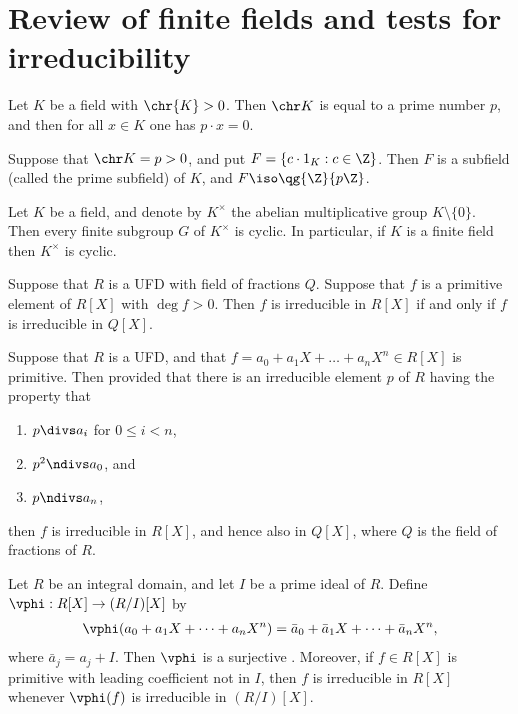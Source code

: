 \documentclass{article}
\begin{document}
\section{Review of finite fields and tests for irreducibility}
  \begin{tproposition}
    Let \( K \) be a field with \( \chr{K} > 0 \). Then \( \chr K \) is equal to a prime number \( p \), and then for all \( x\in K \) one has \( p\cdot x=0 \).
  \end{tproposition}

  \begin{ttheorem}
    Suppose that \( \chr K = p > 0 \), and put \( F=\{ c\cdot 1_K : c\in \Z \} \). Then \( F \) is a subfield (called the prime subfield) of \( K \), and \( F\iso \qg{\Z}{p\Z} \).
  \end{ttheorem}

  \begin{ttheorem}
    Let \( K \) be a field, and denote by \( K^\times \) the abelian multiplicative group \( K\setminus\{ 0 \} \). Then every finite subgroup \( G \) of \( K^\times \) is cyclic. In particular, if \( K \) is a finite field then \( K^\times \) is cyclic.
  \end{ttheorem}

  \begin{ttheorem}
    Suppose that \( R \) is a UFD with field of fractions \( Q \). Suppose that \( f \) is a primitive element of \( R[X] \) with \( \deg f > 0 \). Then \( f \) is irreducible in \( R[X] \) if and only if \( f \) is irreducible in \( Q[X] \).
  \end{ttheorem}

  \begin{ttheorem}
    Suppose that \( R \) is a UFD, and that \( f=a_0+a_1X+\ldots+a_nX^n \in R[X] \) is primitive. Then provided that there is an irreducible element \( p \) of \( R \) having the property that
    \begin{enumerate}[label=(\roman*)]
      \item \( p\divs a_i \) for \( 0\leq i<n \),
      \item \( p^2 \ndivs a_0 \), and
      \item \( p \ndivs a_n \),
    \end{enumerate}
    then \( f \) is irreducible in \( R[X] \), and hence also in \( Q[X] \), where \( Q \) is the field of fractions of \( R \).
  \end{ttheorem}

  \begin{ttheorem}
    Let \( R \) be an integral domain, and let \( I \) be a prime ideal of \( R \). Define \( \vphi:R[X]\to (R/I)[X] \) by
    \begin{align*}
      \vphi(a_0+a_1X+\cdots+a_nX^n) =\bar a_0+\bar a_1X+\cdots+\bar a_nX^n,
    \end{align*}
    where \( \bar a_j = a_j + I \). Then \( \vphi \) is a surjective \homo. Moreover, if \( f\in R[X] \) is primitive with leading coefficient not in \( I \), then \( f \) is irreducible in \( R[X] \) whenever \( \vphi(f) \) is irreducible in \( (R/I)[X] \).
  \end{ttheorem}
\end{document}
